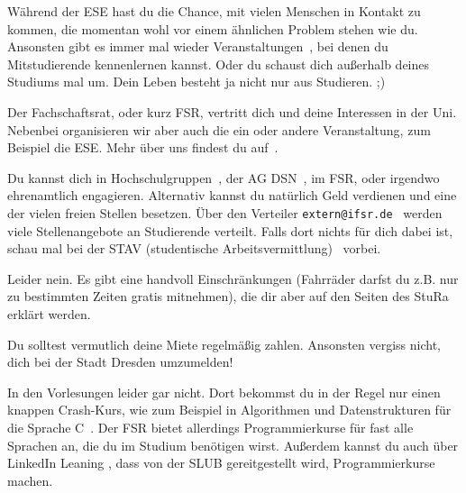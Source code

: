 Während der ESE hast du die Chance, mit vielen Menschen in Kontakt zu kommen, die momentan wohl vor einem ähnlichen Problem stehen wie du.
Ansonsten gibt es immer mal wieder Veranstaltungen~, bei denen du Mitstudierende kennenlernen kannst.
Oder du schaust dich außerhalb deines Studiums mal um. Dein Leben besteht ja nicht nur aus Studieren. ;)

Der Fachschaftsrat, oder kurz FSR, vertritt dich und deine Interessen in der Uni. Nebenbei organisieren wir aber auch die ein oder andere Veranstaltung, zum Beispiel die ESE. Mehr über uns findest du auf~.

Du kannst dich in Hochschulgruppen~, der AG DSN~, im FSR, oder irgendwo ehrenamtlich engagieren. Alternativ kannst du natürlich Geld verdienen und eine der vielen freien Stellen besetzen. Über den Verteiler \texttt{extern@ifsr.de}~ werden viele Stellenangebote an Studierende verteilt. Falls dort nichts für dich dabei ist, schau mal bei der STAV (studentische Arbeitsvermittlung)~ vorbei.

Leider nein. Es gibt eine handvoll Einschränkungen (Fahrräder darfst du z.B. nur zu bestimmten Zeiten gratis mitnehmen), die dir aber auf den Seiten des StuRa~ erklärt werden.

Du solltest vermutlich deine Miete regelmäßig zahlen. Ansonsten vergiss nicht, dich bei der Stadt Dresden umzumelden! 

In den Vorlesungen leider gar nicht. Dort bekommst du in der Regel nur einen knappen Crash-Kurs, wie zum Beispiel in Algorithmen und Datenstrukturen für die Sprache C~.
Der FSR bietet allerdings Programmierkurse für fast alle Sprachen an, die du im Studium benötigen wirst.  Außerdem kannst du auch über LinkedIn Leaning , dass von der SLUB gereitgestellt wird, Programmierkurse machen.


